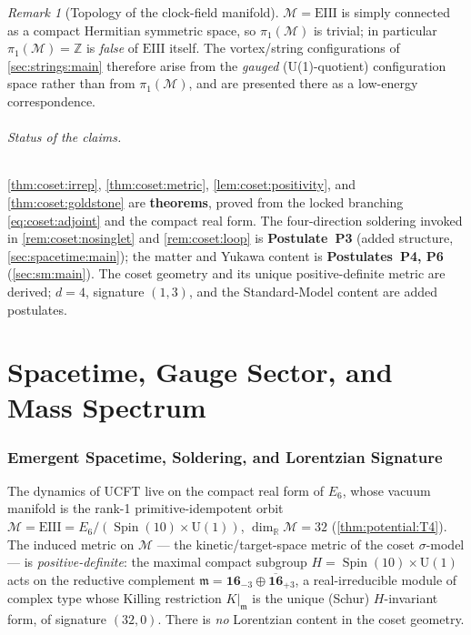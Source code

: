 \documentclass[11pt]{article}
\theoremstyle{plain}
\theoremstyle{definition}
\theoremstyle{remark}
\newtheorem{remark}[theorem]{Remark}
\newcommand{\U}[1]{\mathrm{U}(#1)}
\newcommand{\Spin}{\operatorname{Spin}}
\newcommand{\Uone}{\U{1}}
\newcommand{\EIII}{\mathrm{EIII}}
\begin{document}
\begin{remark}[Topology of the clock-field manifold]\label{rem:coset:topology}
$\mathcal M = \mathrm{EIII}$ is simply connected as a compact Hermitian
symmetric space, so $\pi_{1}(\mathcal M)$ is trivial; in particular
$\pi_{1}(\mathcal M)=\mathbb Z$ is \emph{false} of $\mathrm{EIII}$ itself. The
vortex/string configurations of \autoref{sec:strings:main} therefore arise from the
\emph{gauged} (U(1)-quotient) configuration space rather than from
$\pi_{1}(\mathcal M)$, and are presented there as a low-energy correspondence.
\end{remark}

\paragraph{Status of the claims.}
\autoref{thm:coset:irrep}, \autoref{thm:coset:metric},
\autoref{lem:coset:positivity}, and \autoref{thm:coset:goldstone} are
\textbf{theorems}, proved from the locked branching \eqref{eq:coset:adjoint} and
the compact real form. The four-direction soldering invoked in
\autoref{rem:coset:nosinglet} and \autoref{rem:coset:loop} is
\textbf{Postulate~P3} (added structure, \autoref{sec:spacetime:main}); the matter and
Yukawa content is \textbf{Postulates~P4, P6} (\autoref{sec:sm:main}). The coset geometry and its unique positive-definite
metric are derived; $d=4$, signature $(1,3)$, and the Standard-Model
content are added postulates.
\part{Spacetime, Gauge Sector, and Mass Spectrum}
\section{Emergent Spacetime, Soldering, and Lorentzian Signature}
\label{sec:spacetime:main}
\label{sec:soldering:main}
\label{sec:soldering}

The dynamics of UCFT live on the compact real form of $E_6$, whose vacuum
manifold is the rank-1 primitive-idempotent orbit
$\mathcal M = \EIII = E_6/(\Spin(10)\times\Uone)$, $\dim_{\mathbb R}\mathcal M = 32$
(\autoref{thm:potential:T4}). The induced metric on $\mathcal M$ --- the
kinetic/target-space metric of the coset $\sigma$-model --- is
\emph{positive-definite}: the maximal compact subgroup
$H = \Spin(10)\times\Uone$ acts on the reductive complement
$\mathfrak m = \mathbf{16}_{-3}\oplus\overline{\mathbf{16}}_{+3}$, a real-irreducible
module of complex type whose Killing restriction $K|_{\mathfrak m}$ is the unique
(Schur) $H$-invariant form, of signature $(32,0)$. There is \emph{no} Lorentzian
content in the coset geometry.
\end{document}
